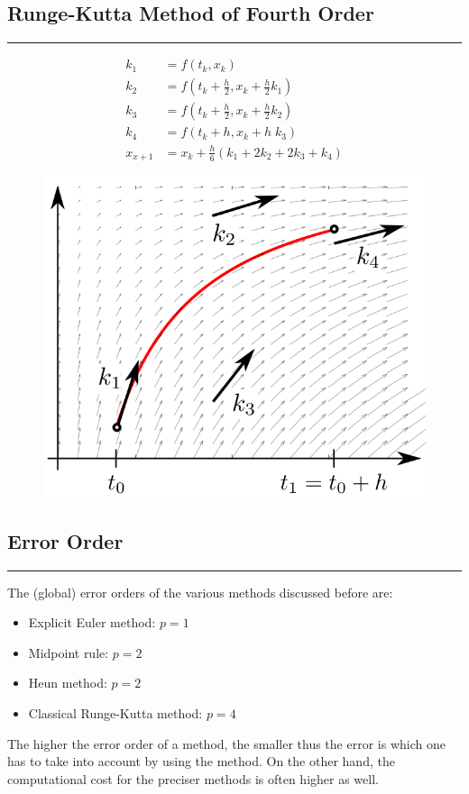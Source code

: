 \subsection{Runge-Kutta Method of Fourth Order}
\noindent\rule[\linienAbstand]{\linewidth}{\linienDicke}
\begin{equation}
  \begin{split}
    k_1 &= f(t_k, x_k)\\
    k_2 &= f(t_k + \frac{h}{2}, x_k + \frac{h}{2}k_1)\\
    k_3 &= f(t_k + \frac{h}{2}, x_k + \frac{h}{2}k_2)\\
    k_4 &= f(t_k + h, x_k +h \; k_3)\\
    x_{x+1} &= x_k + \frac{h}{6}(k_1 + 2k_2 + 2k_3 + k_4)
  \end{split}
\end{equation}

\begin{figure}[H]
  \centering
  \includegraphics[width=0.5\linewidth]{Pics/runge.png}
\end{figure}

\subsection{Error Order}
\noindent\rule[\linienAbstand]{\linewidth}{\linienDicke}
The (global) error orders of the various methods discussed before are:
\begin{itemize}
  \item Explicit Euler method: $p = 1$
  \item Midpoint rule: $p = 2$
  \item Heun method: $p = 2$
  \item Classical Runge-Kutta method: $p = 4$
\end{itemize}
The higher the error order of a method, the smaller thus the error is which one has to take into account by using the method. On the other hand, the computational cost for the preciser methods is often higher as well.
